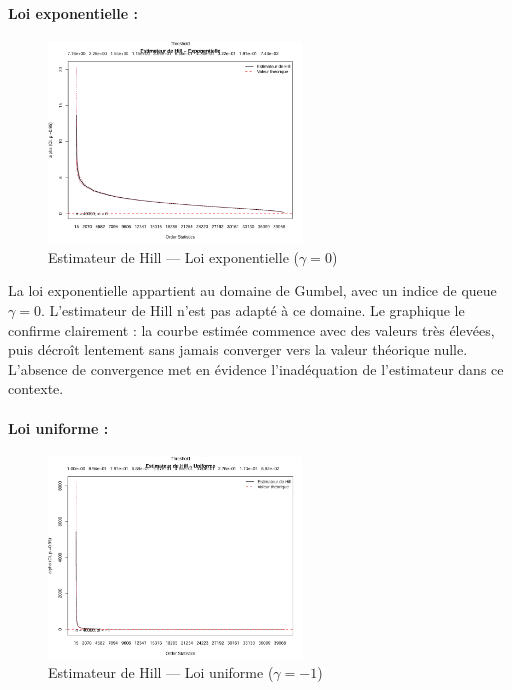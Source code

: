 \documentclass{article}
\theoremstyle{plain}
\theoremstyle{definition}
\theoremstyle{plain}
\begin{document}
\paragraph{Loi exponentielle :}
\begin{figure}[H]
    \centering
    \includegraphics[width=0.6\textwidth]{./images/hill_expo.png}
    \caption{Estimateur de Hill — Loi exponentielle ($\gamma = 0$)}
\end{figure}

La loi exponentielle appartient au domaine de Gumbel, avec un indice de queue $\gamma = 0$. L’estimateur de Hill n’est pas adapté à ce domaine. Le graphique le confirme clairement : la courbe estimée commence avec des valeurs très élevées, puis décroît lentement sans jamais converger vers la valeur théorique nulle. L’absence de convergence met en évidence l’inadéquation de l’estimateur dans ce contexte.
\paragraph{Loi uniforme :}
\begin{figure}[H]
    \centering
    \includegraphics[width=0.6\textwidth]{./images/hill_uniforme.png}
    \caption{Estimateur de Hill — Loi uniforme ($\gamma = -1$)}
\end{figure}
\end{document}

